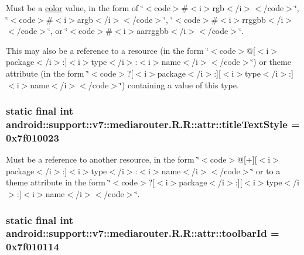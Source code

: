 Must be a \hyperlink{classandroid_1_1support_1_1v7_1_1mediarouter_1_1_r_1_1color}{color} value, in the form of \char`\"{}$<$code$>$\#$<$i$>$rgb$<$/i$>$$<$/code$>$\char`\"{}, \char`\"{}$<$code$>$\#$<$i$>$argb$<$/i$>$$<$/code$>$\char`\"{}, \char`\"{}$<$code$>$\#$<$i$>$rrggbb$<$/i$>$$<$/code$>$\char`\"{}, or \char`\"{}$<$code$>$\#$<$i$>$aarrggbb$<$/i$>$$<$/code$>$\char`\"{}. 

This may also be a reference to a resource (in the form \char`\"{}$<$code$>$@\mbox{[}$<$i$>$package$<$/i$>$:\mbox{]}$<$i$>$type$<$/i$>$:$<$i$>$name$<$/i$>$$<$/code$>$\char`\"{}) or theme attribute (in the form \char`\"{}$<$code$>$?\mbox{[}$<$i$>$package$<$/i$>$:\mbox{]}\mbox{[}$<$i$>$type$<$/i$>$:\mbox{]}$<$i$>$name$<$/i$>$$<$/code$>$\char`\"{}) containing a value of this type. \hypertarget{classandroid_1_1support_1_1v7_1_1mediarouter_1_1_r_1_1attr_922327317bb2a26ef53821ffd0822f46}{
\subsubsection[{titleTextStyle}]{\setlength{\rightskip}{0pt plus 5cm}static final int android::support::v7::mediarouter.R.R::attr::titleTextStyle = 0x7f010023}}
\label{classandroid_1_1support_1_1v7_1_1mediarouter_1_1_r_1_1attr_922327317bb2a26ef53821ffd0822f46}


Must be a reference to another resource, in the form \char`\"{}$<$code$>$@\mbox{[}+\mbox{]}\mbox{[}$<$i$>$package$<$/i$>$:\mbox{]}$<$i$>$type$<$/i$>$:$<$i$>$name$<$/i$>$$<$/code$>$\char`\"{} or to a theme attribute in the form \char`\"{}$<$code$>$?\mbox{[}$<$i$>$package$<$/i$>$:\mbox{]}\mbox{[}$<$i$>$type$<$/i$>$:\mbox{]}$<$i$>$name$<$/i$>$$<$/code$>$\char`\"{}. \hypertarget{classandroid_1_1support_1_1v7_1_1mediarouter_1_1_r_1_1attr_4b3d4f669f18c5980bb14f853b4b66cf}{
\subsubsection[{toolbarId}]{\setlength{\rightskip}{0pt plus 5cm}static final int android::support::v7::mediarouter.R.R::attr::toolbarId = 0x7f010114}}
\label{classandroid_1_1support_1_1v7_1_1mediarouter_1_1_r_1_1attr_4b3d4f669f18c5980bb14f853b4b66cf}


